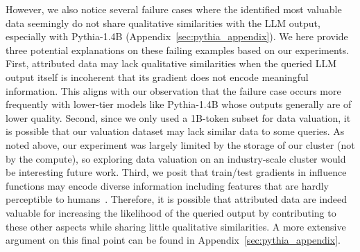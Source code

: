 However, we also notice several failure cases where the identified most valuable data seemingly do not share qualitative similarities with the LLM output, especially with Pythia-1.4B (Appendix~\ref{sec:pythia_appendix}). We here provide three potential explanations on these failing examples based on our experiments. First, attributed data may lack qualitative similarities when the queried LLM output itself is incoherent that its gradient does not encode meaningful information. This aligns with our observation that the failure case occurs more frequently with lower-tier models like Pythia-1.4B whose outputs generally are of lower quality. Second, since we only used a 1B-token subset for data valuation, it is possible that our valuation dataset may lack similar data to some queries. As noted above, our experiment was largely limited by the storage of our cluster (not by the compute), so exploring data valuation on an industry-scale cluster would be interesting future work. Third, we posit that train/test gradients in influence functions may encode diverse information including features that are hardly perceptible to humans~\cite{ilyas2019adversarial}. Therefore, it is possible that attributed data are indeed valuable for increasing the likelihood of the queried output by contributing to these other aspects while sharing little qualitative similarities. A more extensive argument on this final point can be found in Appendix~\ref{sec:pythia_appendix}.